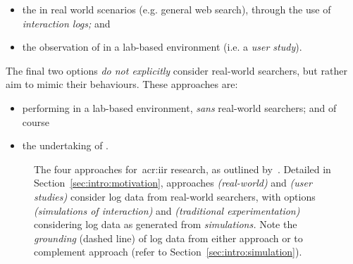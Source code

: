 \begin{itemize}
    \item[]{ the  in real world scenarios (e.g. general web search), through the use of \emph{interaction logs;} and}
    \item[]{ the observation of  in a lab-based environment (i.e. a \emph{user study}).}
\end{itemize}

The final two options \emph{do not explicitly} consider real-world searchers, but rather aim to mimic their behaviours. These approaches are:

\begin{itemize}
    \item[]{ performing  in a lab-based environment, \emph{sans} real-world searchers; and of course}
    \item[]{ the undertaking of .}
\end{itemize}

\begin{figure}[t!]
    \centering
    \caption[Approaches to~\gls{acr:iir} research]{The four approaches for~\gls{acr:iir} research, as outlined by~\cite{keskustalo2008user_simulation}. Detailed in Section~\ref{sec:intro:motivation}, approaches  \emph{(real-world)} and  \emph{(user studies)} consider log data from real-world searchers, with options  \emph{(simulations of interaction)} and  \emph{(traditional experimentation)} considering log data as generated from \emph{simulations.} Note the \emph{grounding} (dashed line) of log data from either approach  or  to complement approach  (refer to Section~\ref{sec:intro:simulation}).\vspace*{10mm}}
    \label{fig:ch1-options}
\end{figure}

